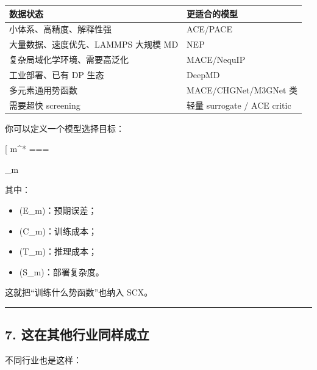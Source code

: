 \documentclass[
  12pt,
]{ctexart}
\providecommand{\tightlist}{%
  \setlength{\itemsep}{0pt}\setlength{\parskip}{0pt}}
\begin{document}
\begin{longtable}[]{@{}ll@{}}
\toprule\noalign{}
数据状态 & 更适合的模型 \\
\midrule\noalign{}
\endhead
\bottomrule\noalign{}
\endlastfoot
小体系、高精度、解释性强 & ACE/PACE \\
大量数据、速度优先、LAMMPS 大规模 MD & NEP \\
复杂局域化学环境、需要高泛化 & MACE/NequIP \\
工业部署、已有 DP 生态 & DeepMD \\
多元素通用势函数 & MACE/CHGNet/M3GNet 类 \\
需要超快 screening & 轻量 surrogate / ACE critic \\
\end{longtable}

你可以定义一个模型选择目标：

{[} m\^{}* ===

\arg\min\_m \left[
\mathcal E_m(\mathcal D_{\mathrm{SCX}})
+
\lambda C_m
+
\beta T_m
+
\gamma S_m
\right]{]}

其中：

\begin{itemize}
\tightlist
\item
  (\mathcal E\_m)：预期误差；
\item
  (C\_m)：训练成本；
\item
  (T\_m)：推理成本；
\item
  (S\_m)：部署复杂度。
\end{itemize}

这就把``训练什么势函数''也纳入 SCX。

\begin{center}\rule{0.5\linewidth}{0.5pt}\end{center}

\subsection{7.
这在其他行业同样成立}\label{ux8fd9ux5728ux5176ux4ed6ux884cux4e1aux540cux6837ux6210ux7acb}

不同行业也是这样：
\end{document}
